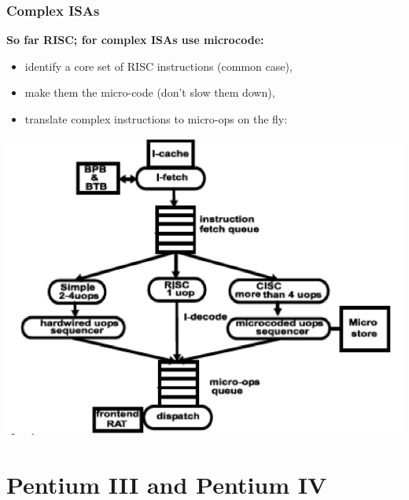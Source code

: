 \documentclass{beamer}
\newcommand{\emp}[1]{\textcolor{DikuRed}{ #1}}
\begin{document}
\begin{frame}[fragile,t]
\frametitle{Complex ISAs}

\emp{\bf So far RISC; for complex ISAs use microcode:}
\begin{itemize}
\item identify a core set of RISC instructions (common case),
\item make them the micro-code (don't slow them down),
\item translate complex instructions to micro-ops on the fly:
\end{itemize}

\includegraphics[width=47ex]{FigsOoOProc/ComplexISA.pdf}

\end{frame}


\section{Pentium III and Pentium IV}

\begin{frame}[fragile]
	\tableofcontents[currentsection]
\end{frame}
\end{document}
